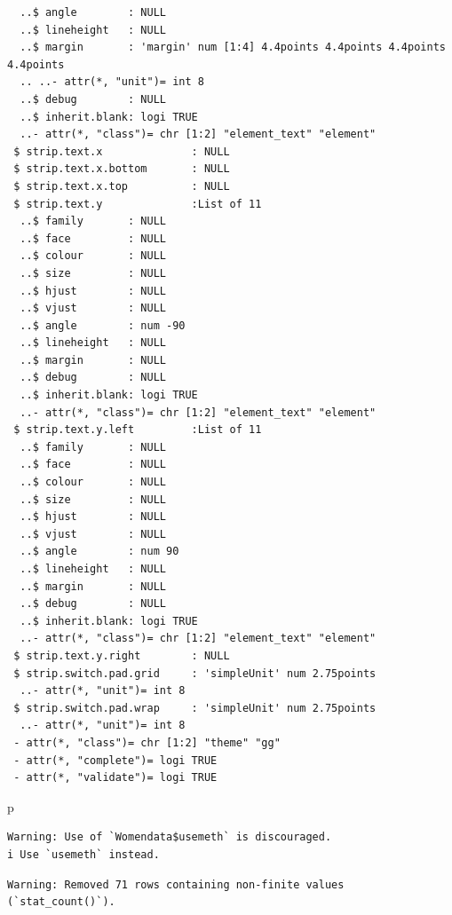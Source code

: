 \documentclass[
  letterpaper,
  DIV=11,
  numbers=noendperiod]{scrartcl}
\newenvironment{Shaded}{\begin{snugshade}}{\end{snugshade}}
\newcommand{\NormalTok}[1]{\textcolor[rgb]{0.00,0.23,0.31}{#1}}
\begin{document}
\begin{verbatim}
  ..$ angle        : NULL
  ..$ lineheight   : NULL
  ..$ margin       : 'margin' num [1:4] 4.4points 4.4points 4.4points 4.4points
  .. ..- attr(*, "unit")= int 8
  ..$ debug        : NULL
  ..$ inherit.blank: logi TRUE
  ..- attr(*, "class")= chr [1:2] "element_text" "element"
 $ strip.text.x              : NULL
 $ strip.text.x.bottom       : NULL
 $ strip.text.x.top          : NULL
 $ strip.text.y              :List of 11
  ..$ family       : NULL
  ..$ face         : NULL
  ..$ colour       : NULL
  ..$ size         : NULL
  ..$ hjust        : NULL
  ..$ vjust        : NULL
  ..$ angle        : num -90
  ..$ lineheight   : NULL
  ..$ margin       : NULL
  ..$ debug        : NULL
  ..$ inherit.blank: logi TRUE
  ..- attr(*, "class")= chr [1:2] "element_text" "element"
 $ strip.text.y.left         :List of 11
  ..$ family       : NULL
  ..$ face         : NULL
  ..$ colour       : NULL
  ..$ size         : NULL
  ..$ hjust        : NULL
  ..$ vjust        : NULL
  ..$ angle        : num 90
  ..$ lineheight   : NULL
  ..$ margin       : NULL
  ..$ debug        : NULL
  ..$ inherit.blank: logi TRUE
  ..- attr(*, "class")= chr [1:2] "element_text" "element"
 $ strip.text.y.right        : NULL
 $ strip.switch.pad.grid     : 'simpleUnit' num 2.75points
  ..- attr(*, "unit")= int 8
 $ strip.switch.pad.wrap     : 'simpleUnit' num 2.75points
  ..- attr(*, "unit")= int 8
 - attr(*, "class")= chr [1:2] "theme" "gg"
 - attr(*, "complete")= logi TRUE
 - attr(*, "validate")= logi TRUE
\end{verbatim}

\begin{Shaded}
\begin{Highlighting}[]
\NormalTok{p}
\end{Highlighting}
\end{Shaded}

\begin{verbatim}
Warning: Use of `Womendata$usemeth` is discouraged.
i Use `usemeth` instead.
\end{verbatim}

\begin{verbatim}
Warning: Removed 71 rows containing non-finite values (`stat_count()`).
\end{verbatim}
\end{document}
